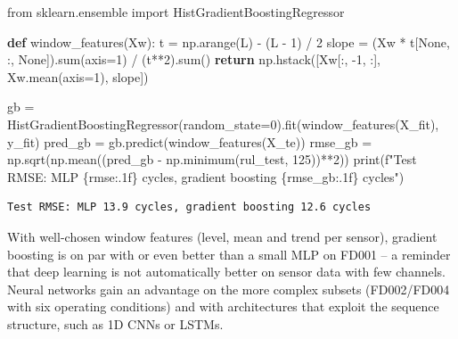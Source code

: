 \documentclass[
  letterpaper,
  DIV=11,
  numbers=noendperiod]{scrreprt}
\newenvironment{Shaded}{\begin{snugshade}}{\end{snugshade}}
\newcommand{\BuiltInTok}[1]{\textcolor[rgb]{0.00,0.23,0.31}{#1}}
\newcommand{\ControlFlowTok}[1]{\textcolor[rgb]{0.00,0.23,0.31}{\textbf{#1}}}
\newcommand{\DecValTok}[1]{\textcolor[rgb]{0.68,0.00,0.00}{#1}}
\newcommand{\ImportTok}[1]{\textcolor[rgb]{0.00,0.46,0.62}{#1}}
\newcommand{\KeywordTok}[1]{\textcolor[rgb]{0.00,0.23,0.31}{\textbf{#1}}}
\newcommand{\NormalTok}[1]{\textcolor[rgb]{0.00,0.23,0.31}{#1}}
\newcommand{\OperatorTok}[1]{\textcolor[rgb]{0.37,0.37,0.37}{#1}}
\newcommand{\SpecialCharTok}[1]{\textcolor[rgb]{0.37,0.37,0.37}{#1}}
\newcommand{\SpecialStringTok}[1]{\textcolor[rgb]{0.13,0.47,0.30}{#1}}
\newcommand{\VariableTok}[1]{\textcolor[rgb]{0.07,0.07,0.07}{#1}}
\begin{document}
\begin{tcolorbox}[enhanced jigsaw, left=2mm, title=\textcolor{quarto-callout-caution-color}{\faFire}\hspace{0.5em}{Solution to Exercise 1}, opacityback=0, breakable, rightrule=.15mm, arc=.35mm, toptitle=1mm, colbacktitle=quarto-callout-caution-color!10!white, opacitybacktitle=0.6, coltitle=black, colframe=quarto-callout-caution-color-frame, bottomrule=.15mm, leftrule=.75mm, bottomtitle=1mm, titlerule=0mm, toprule=.15mm, colback=white]

\begin{Shaded}
\begin{Highlighting}[]
\ImportTok{from}\NormalTok{ sklearn.ensemble }\ImportTok{import}\NormalTok{ HistGradientBoostingRegressor}

\KeywordTok{def}\NormalTok{ window\_features(Xw):}
\NormalTok{    t }\OperatorTok{=}\NormalTok{ np.arange(L) }\OperatorTok{{-}}\NormalTok{ (L }\OperatorTok{{-}} \DecValTok{1}\NormalTok{) }\OperatorTok{/} \DecValTok{2}
\NormalTok{    slope }\OperatorTok{=}\NormalTok{ (Xw }\OperatorTok{*}\NormalTok{ t[}\VariableTok{None}\NormalTok{, :, }\VariableTok{None}\NormalTok{]).}\BuiltInTok{sum}\NormalTok{(axis}\OperatorTok{=}\DecValTok{1}\NormalTok{) }\OperatorTok{/}\NormalTok{ (t}\OperatorTok{**}\DecValTok{2}\NormalTok{).}\BuiltInTok{sum}\NormalTok{()}
    \ControlFlowTok{return}\NormalTok{ np.hstack([Xw[:, }\OperatorTok{{-}}\DecValTok{1}\NormalTok{, :], Xw.mean(axis}\OperatorTok{=}\DecValTok{1}\NormalTok{), slope])}

\NormalTok{gb }\OperatorTok{=}\NormalTok{ HistGradientBoostingRegressor(random\_state}\OperatorTok{=}\DecValTok{0}\NormalTok{).fit(window\_features(X\_fit), y\_fit)}
\NormalTok{pred\_gb }\OperatorTok{=}\NormalTok{ gb.predict(window\_features(X\_te))}
\NormalTok{rmse\_gb }\OperatorTok{=}\NormalTok{ np.sqrt(np.mean((pred\_gb }\OperatorTok{{-}}\NormalTok{ np.minimum(rul\_test, }\DecValTok{125}\NormalTok{))}\OperatorTok{**}\DecValTok{2}\NormalTok{))}
\BuiltInTok{print}\NormalTok{(}\SpecialStringTok{f"Test RMSE: MLP }\SpecialCharTok{\{}\NormalTok{rmse}\SpecialCharTok{:.1f\}}\SpecialStringTok{ cycles, gradient boosting }\SpecialCharTok{\{}\NormalTok{rmse\_gb}\SpecialCharTok{:.1f\}}\SpecialStringTok{ cycles"}\NormalTok{)}
\end{Highlighting}
\end{Shaded}

\begin{verbatim}
Test RMSE: MLP 13.9 cycles, gradient boosting 12.6 cycles
\end{verbatim}

With well-chosen window features (level, mean and trend per sensor),
gradient boosting is on par with or even better than a small MLP on
FD001 -- a reminder that deep learning is not automatically better on
sensor data with few channels. Neural networks gain an advantage on the
more complex subsets (FD002/FD004 with six operating conditions) and
with architectures that exploit the sequence structure, such as 1D CNNs
or LSTMs.

\end{tcolorbox}
\end{document}
